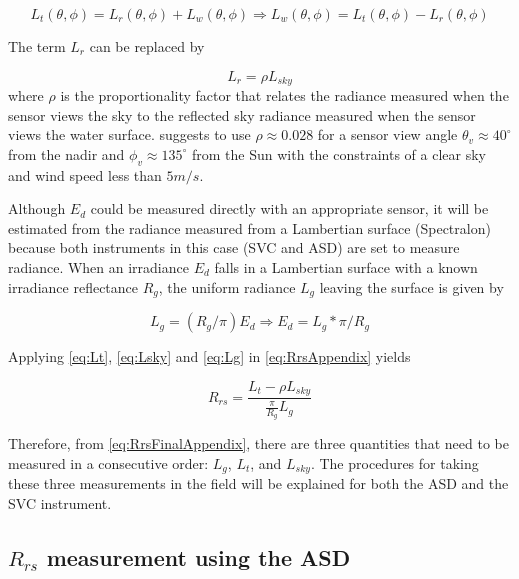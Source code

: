 \begin{appendices}
\begin{equation}\label{eq:Lt}
	L_t(\theta,\phi) = L_r(\theta,\phi)+L_w(\theta,\phi)\Rightarrow L_w(\theta,\phi)=L_t(\theta,\phi) - L_r(\theta,\phi)
\end{equation}

The term $L_r$ can be replaced by

\begin{equation}\label{eq:Lsky}
	L_r = \rho L_{sky}
\end{equation}
where $\rho$ is the proportionality factor that relates the radiance measured when the sensor views the sky to the reflected sky radiance measured when the sensor views the water surface. \citet{Mobley:1999} suggests to use $\rho \approx 0.028$ for a sensor view angle $\theta_v \approx 40^\circ$ from the nadir and  $\phi_v \approx 135^\circ$ from the Sun with the constraints of a clear sky and wind speed less than $5m/s$.

Although $E_d$ could be measured directly with an appropriate sensor, it will be estimated from the radiance measured from a Lambertian surface (Spectralon) because both instruments in this case (SVC and ASD) are set to measure radiance. When an irradiance $E_d$ falls in a Lambertian surface with a known irradiance reflectance $R_g$, the uniform radiance $L_g$ leaving the surface is given by 

\begin{equation}\label{eq:Lg}
	L_g = (R_g/\pi)E_d\Rightarrow E_d = L_g*\pi/R_g
\end{equation}

Applying \autoref{eq:Lt}, \autoref{eq:Lsky} and \autoref{eq:Lg} in \autoref{eq:RrsAppendix} yields

\begin{equation}\label{eq:RrsFinalAppendix}
	R_{rs} = \frac{L_t-\rho L_{sky}}{\frac{\displaystyle \pi}{\displaystyle R_g}L_g}
\end{equation}

Therefore, from \autoref{eq:RrsFinalAppendix}, there are three quantities that need to be measured in a consecutive order: $L_g$, $L_t$, and $L_{sky}$. The procedures for taking these three measurements in the field will be explained for both the ASD and the SVC instrument.

\subsection{\texorpdfstring{$R_{rs}$}{Rrs} measurement using the ASD}


\end{appendices}
